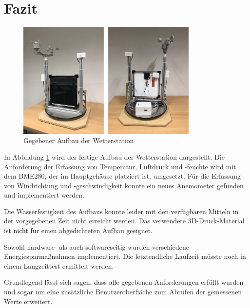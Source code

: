 \section{Fazit}\label{sec:fazit}
\begin{figure}[H]
  \centering
  \includegraphics[width=0.8\textwidth]{./img/Wetterstaion_fertig1.jpg}
  \caption{Gegebener Aufbau der Wetterstation}\label{fig.Wetterstationfertig}
\end{figure}

In Abbildung \ref{fig.Wetterstationfertig} wird der fertige Aufbau der Wetterstation dargestellt. Die Anforderung der Erfassung von Temperatur, Luftdruck und -feuchte wird mit dem BME280, der im Hauptgehäuse platziert ist, umgesetzt. Für die Erfassung von Windrichtung und -geschwindigkeit konnte ein neues Anemometer gefunden und implementiert werden.

Die Wasserfestigkeit des Aufbaus konnte leider mit den verfügbaren Mitteln in der vorgegebenen Zeit nicht erreicht werden. Das verwendete 3D-Druck-Material ist nicht für einen abgedichteten Aufbau geeignet. 

Sowohl hardware- als auch softwareseitig wurden verschiedene Energiesparmaßnahmen implementiert. Die letztendliche Laufzeit müsste noch in einem Langzeittest ermittelt werden.

Grundlegend lässt sich sagen, dass alle gegebenen Anforderungen erfüllt wurden und sogar um eine zusätzliche Benutzeroberfläche zum Abrufen der gemessenen Werte erweitert.


